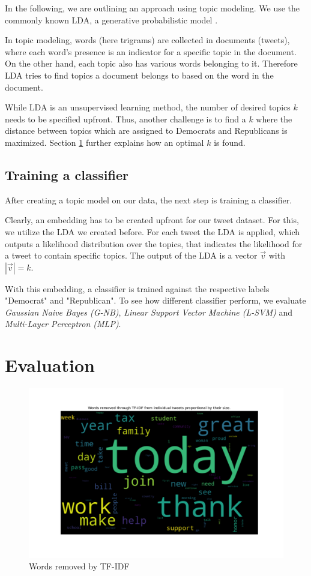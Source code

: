 \documentclass[sigconf, nonacm]{acmart}
\begin{document}
In the following, we are outlining an approach using topic modeling. We use the commonly known LDA, a generative probabilistic model \cite{lda}.

In topic modeling, words (here trigrams) are collected in documents (tweets), where each word's presence is an indicator for a specific topic in the document. On the other hand, each topic also has various words belonging to it. Therefore LDA tries to find topics a document belongs to based on the word in the document.

While LDA is an unsupervised learning method, the number of desired topics $k$ needs to be specified upfront. 
Thus, another challenge is to find a $k$ where the distance between topics which are assigned to Democrats and Republicans is maximized. 
Section \ref{sec:eval} further explains how an optimal $k$ is found.

\subsection{Training a classifier}
\label{subsec:classify}
After creating a topic model on our data, the next step is training a classifier.

Clearly, an embedding has to be created upfront for our tweet dataset.
For this, we utilize the LDA we created before.
For each tweet the LDA is applied, which outputs a likelihood distribution over the topics, that indicates the likelihood for a tweet to contain specific topics.
The output of the LDA is a vector $\vec{v}$ with $|\vec{v}|=k$.

With this embedding, a classifier is trained against the respective labels "Democrat" and "Republican". To see how different classifier perform, we evaluate \textit{Gaussian Naive Bayes (G-NB)}, \textit{Linear Support Vector Machine (L-SVM)} and \textit{Multi-Layer Perceptron (MLP)}.

\section{Evaluation}
\label{sec:eval}
\begin{figure}[ht]
	\centering
	\includegraphics[width=0.95\linewidth, trim={3.5cm 3cm 3.5cm 2.7cm}, clip]{figures/40k/diff_wordcloud_tfidf.pdf}
	\caption{Words removed by TF-IDF}
	\label{fig:tfidf}
\end{figure}
\end{document}
